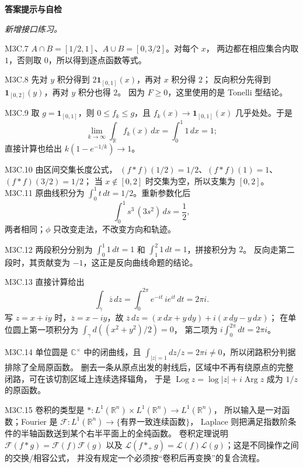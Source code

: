 \documentclass[UTF8,fontset=none,a4paper,11pt]{ctexart}
\theoremstyle{foundation-definition}
\theoremstyle{foundation-theorem}
\theoremstyle{foundation-proposition}
\theoremstyle{foundation-example}
\theoremstyle{foundation-remark}
\theoremstyle{foundation-theorem}
\newenvironment{answerkey}{%
\begin{mdframed}[backgroundcolor=examplebg,linecolor=examplepurple,linewidth=1.0pt,
  leftline=true,rightline=false,topline=false,bottomline=false,
  skipabove=7pt,skipbelow=8pt,innerleftmargin=10pt,innerrightmargin=8pt,
  innertopmargin=6pt,innerbottommargin=6pt]
{\sffamily\bfseries\color{examplepurple}答案提示与自检}\par\smallskip\small
}{\end{mdframed}}
\begin{document}
\begin{answerkey}
\textit{新增接口练习。}\par\smallskip
M3C.7 \(A\cap B=[1/2,1]\)、\(A\cup B=[0,3/2]\)。对每个 \(x\)，
两边都在相应集合内取 \(1\)，否则取 \(0\)，所以得到逐点函数等式。\par
M3C.8 先对 \(y\) 积分得到 \(2\mathbf 1_{[0,1]}(x)\)，再对 \(x\) 积分得 \(2\)；
反向积分先得到 \(\mathbf 1_{[0,2]}(y)\)，再对 \(y\) 积分也得 \(2\)。
因为 \(F\geq0\)，这里使用的是 Tonelli 型结论。\par
M3C.9 取 \(g=\mathbf 1_{[0,1]}\)，则 \(0\leq f_k\leq g\)，且
\(f_k(x)\to\mathbf 1_{[0,1]}(x)\) 几乎处处。于是
\[
\lim_{k\to\infty}\int_{\mathbb R}f_k(x)\,dx
=\int_0^1 1\,dx=1;
\]
直接计算也给出 \(k(1-e^{-1/k})\to1\)。\par
M3C.10 由区间交集长度公式，
\((f*f)(1/2)=1/2\)、\((f*f)(1)=1\)、\((f*f)(3/2)=1/2\)；
当 \(x\notin[0,2]\) 时交集为空，所以支集为 \([0,2]\)。
M3C.11 原曲线积分为
\(\int_0^1 t\,dt=1/2\)。重新参数化后
\[
\int_0^1 s^3\,(3s^2)\,ds=\frac12,
\]
两者相同；\(\phi\) 只改变走法，不改变方向和轨迹。\par
M3C.12 两段积分分别为
\(\int_0^1 1\,dt=1\) 和 \(\int_1^2 1\,dt=1\)，拼接积分为 \(2\)。
反向走第二段时，其贡献变为 \(-1\)，这正是反向曲线命题的结论。\par
M3C.13 直接计算给出
\[
\int_\gamma\overline z\,dz
=\int_0^{2\pi}e^{-it}\,i e^{it}\,dt=2\pi i.
\]
写 \(z=x+iy\) 时，\(\overline z=x-iy\)，故
\(\overline z\,dz=(x\,dx+y\,dy)+i(x\,dy-y\,dx)\)；
在单位圆上第一项积分为 \(\int_\gamma d((x^2+y^2)/2)=0\)，
第二项为 \(i\int_0^{2\pi}dt=2\pi i\)。\par
M3C.14 单位圆是 \(\mathbb C^\times\) 中的闭曲线，且
\(\int_{|z|=1}dz/z=2\pi i\ne0\)，所以闭路积分判据排除了全局原函数。
删去一条从原点出发的射线后，区域中不再有绕原点的完整闭路，可在该切割区域上连续选择辐角，
于是 \(\operatorname{Log} z=\log|z|+i\operatorname{Arg} z\) 成为 \(1/z\) 的原函数。\par
M3C.15 卷积的类型是
\( *:L^1(\mathbb R^n)\times L^1(\mathbb R^n)\to L^1(\mathbb R^n)\)，
所以输入是一对函数；Fourier 是
\(\mathcal F:L^1(\mathbb R^n)\to\{\text{有界一致连续函数}\}\)，
Laplace 则把满足指数阶条件的半轴函数送到某个右半平面上的全纯函数。
卷积定理说明
\(\mathcal F(f*g)=\mathcal F(f)\mathcal F(g)\) 以及
\(\mathcal L(f*_+g)=\mathcal L(f)\mathcal L(g)\)；这是不同操作之间的交换/相容公式，
并没有规定一个必须按“卷积后再变换”的复合流程。\par
\end{answerkey}
\end{document}
